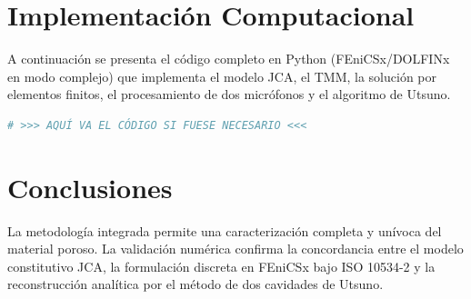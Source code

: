 \documentclass[11pt,a4paper]{article}
\begin{document}
\section{Implementación Computacional}
\label{sec:codigo}
A continuación se presenta el código completo en Python (FEniCSx/DOLFINx en modo complejo) que implementa el modelo JCA, el TMM, la solución por elementos finitos, el procesamiento de dos micrófonos y el algoritmo de Utsuno.

\begin{lstlisting}[language=Python]
# >>> AQUÍ VA EL CÓDIGO SI FUESE NECESARIO <<<
\end{lstlisting}

\section{Conclusiones}
La metodología integrada permite una caracterización completa y unívoca del material poroso. La validación numérica confirma la concordancia entre el modelo constitutivo JCA, la formulación discreta en FEniCSx bajo ISO 10534-2 y la reconstrucción analítica por el método de dos cavidades de Utsuno.



\end{document}
